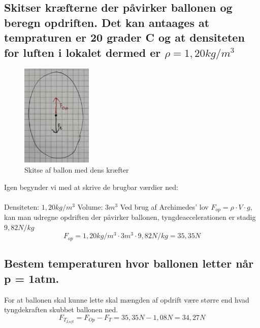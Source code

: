 \subsection{Skitser kræfterne der påvirker ballonen og beregn opdriften. Det kan antaages at tempraturen er 20 grader C og at densiteten for luften i lokalet dermed er \begin{math}\rho=1,20kg/m^3\end{math}}
\begin{figure}[h!]
    \centering
    \includegraphics[width=0.3\textwidth]{figures/ballonskitse.png}
    \caption{Skitse af ballon med dens kræfter}
\end{figure}
Igen begynder vi med at skrive de brugbar værdier ned:
\\\\
Densiteten: \begin{math}1,20kg/m^3\end{math} \newline
Volume: \begin{math}3m^3\end{math} \newline
Ved brug af Archimedes' lov \begin{math}F_{op}=\rho\cdot V\cdot g\end{math}, kan man udregne opdriften der påvirker ballonen, tyngdeaccelerationen er stadig \begin{math}9,82 N/kg\end{math}
\begin{equation}
	F_{op}=1,20kg/m^3 \cdot 3m^3 \cdot 9,82N/kg=35,35N
\end{equation}

\subsection{Bestem temperaturen hvor ballonen letter når p = 1atm.}
For at ballonen skal kunne lette skal mængden af opdrift være større end hvad tyngdekraften skubbet ballonen ned.
\begin{equation*}
	F_{T_{Luft}} = F_{Op} - F_{T} = 35,35N - 1,08N = 34,27N
\end{equation*}

